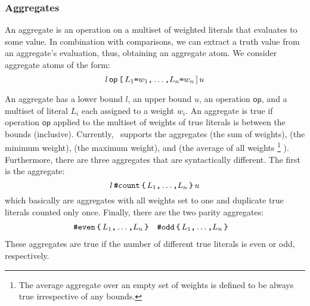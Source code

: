 \subsubsection{Aggregates}\label{subsec:gringo:aggregate}

An aggregate is an operation on a multiset of weighted literals that evaluates to some value. 
In combination with comparisons, we can extract a truth value from an aggregate's evaluation,
thus, obtaining an aggregate atom.
We consider aggregate atoms of the form:
\[l\,\mathsf{op}\,\texttt{[}\, L_1\texttt{=}w_1\texttt{,} \dots\texttt{,} L_n\texttt{=}w_n {\,]\,} u\]

An aggregate has a lower bound $l$, an upper bound $u$, an operation $\mathsf{op}$, 
and a multiset of literal $L_i$ each assigned to a weight $w_i$.
An aggregate is true if operation $\mathsf{op}$ applied to the multiset of weights 
of true literals is between the bounds (inclusive).
Currently, \gringo\ supports the aggregates 
 (the sum of weights), 
 (the minimum weight), 
 (the maximum weight), and 
 (the average of all weights 
\footnote{The average aggregate over an empty set of weights is defined to be always true irrespective of any bounds.}%
).
Furthermore, there are three aggregates that are syntactically different.
The first is the  aggregate:
\[l\,\code{\#count}\,\code{\char`\{}\, L_1\code{,} \dots\code{,} L_n \,\code{\char`\}}\, u\]%
which basically are  aggregates with all weights set to one 
and duplicate true literals counted only once.
Finally, there are the two parity aggregates:
%
%
\begin{align*}
&\code{\#even}\,\code{\char`\{}\, L_1\code{,} \dots\code{,} L_n \,\code{\char`\}} & &
\code{\#odd}\,\code{\char`\{}\, L_1\code{,} \dots\code{,} L_n \,\code{\char`\}}
\end{align*}%
These aggregates are true if the number of different true literals is even or odd, respectively.

